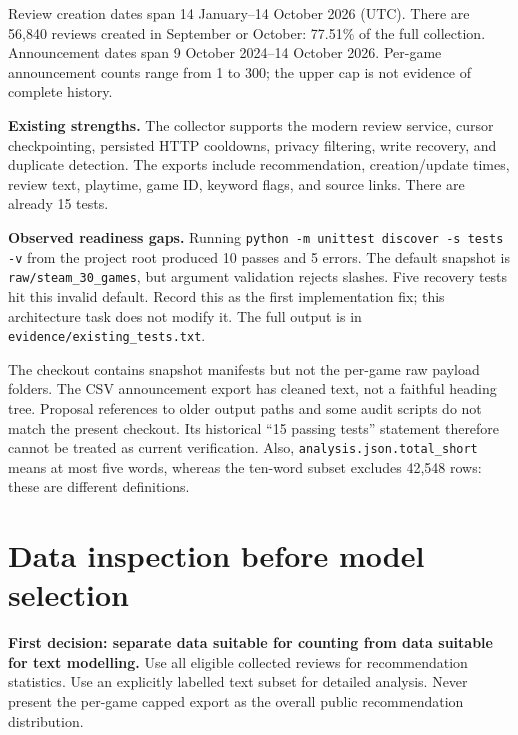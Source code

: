 \documentclass[10pt,letterpaper]{article}
\newcommand{\key}[1]{\textbf{\color{ink}#1}}
\newcommand{\nextsection}[1]{\clearpage\section{#1}}
\newenvironment{decision}{\begin{tcolorbox}[colback=pale,colframe=teal,boxrule=0.5pt,arc=2pt,left=9pt,right=9pt,top=6pt,bottom=6pt]}{\end{tcolorbox}}
\begin{document}
Review creation dates span 14 January--14 October 2026 (UTC). There are 56,840 reviews created in September or October: 77.51\% of the full collection. Announcement dates span 9 October 2024--14 October 2026. Per-game announcement counts range from 1 to 300; the upper cap is not evidence of complete history.

\key{Existing strengths.} The collector supports the modern review service, cursor checkpointing, persisted HTTP cooldowns, privacy filtering, write recovery, and duplicate detection. The exports include recommendation, creation/update times, review text, playtime, game ID, keyword flags, and source links. There are already 15 tests.

\key{Observed readiness gaps.} Running \texttt{python -m unittest discover -s tests -v} from the project root produced 10 passes and 5 errors. The default snapshot is \texttt{raw/steam\_30\_games}, but argument validation rejects slashes. Five recovery tests hit this invalid default. Record this as the first implementation fix; this architecture task does not modify it. The full output is in \texttt{evidence/existing\_tests.txt}.

The checkout contains snapshot manifests but not the per-game raw payload folders. The CSV announcement export has cleaned text, not a faithful heading tree. Proposal references to older output paths and some audit scripts do not match the present checkout. Its historical ``15 passing tests'' statement therefore cannot be treated as current verification. Also, \texttt{analysis.json.total\_short} means at most five words, whereas the ten-word subset excludes 42,548 rows: these are different definitions.

\nextsection{Data inspection before model selection}
\begin{decision}
\key{First decision: separate data suitable for counting from data suitable for text modelling.} Use all eligible collected reviews for recommendation statistics. Use an explicitly labelled text subset for detailed analysis. Never present the per-game capped export as the overall public recommendation distribution.
\end{decision}
\end{document}
